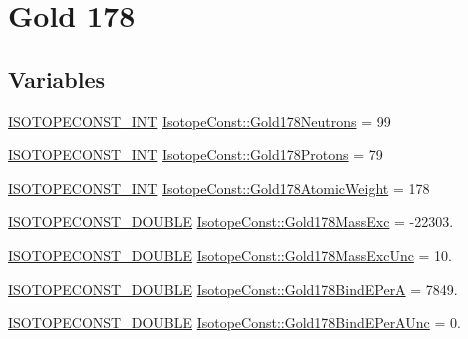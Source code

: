 \hypertarget{group___isotope_const-_gold-_au178}{}\section{Gold 178}
\label{group___isotope_const-_gold-_au178}
\subsection*{Variables}
\begin{DoxyCompactItemize}
\item 
\mbox{\hyperlink{group___isotope_const-_macros_ga5f18360b3e99483a35c32d789e62621c}{I\+S\+O\+T\+O\+P\+E\+C\+O\+N\+S\+T\+\_\+\+I\+NT}} \mbox{\hyperlink{group___isotope_const-_gold-_au178_ga73c46fa2cbd846f3ba7d72ea4b63a835}{Isotope\+Const\+::\+Gold178\+Neutrons}} = 99
\item 
\mbox{\hyperlink{group___isotope_const-_macros_ga5f18360b3e99483a35c32d789e62621c}{I\+S\+O\+T\+O\+P\+E\+C\+O\+N\+S\+T\+\_\+\+I\+NT}} \mbox{\hyperlink{group___isotope_const-_gold-_au178_ga8413b41724d5d9a8403087a3dbaee4da}{Isotope\+Const\+::\+Gold178\+Protons}} = 79
\item 
\mbox{\hyperlink{group___isotope_const-_macros_ga5f18360b3e99483a35c32d789e62621c}{I\+S\+O\+T\+O\+P\+E\+C\+O\+N\+S\+T\+\_\+\+I\+NT}} \mbox{\hyperlink{group___isotope_const-_gold-_au178_ga3683cf8598a77df47cc90702f637760e}{Isotope\+Const\+::\+Gold178\+Atomic\+Weight}} = 178
\item 
\mbox{\hyperlink{group___isotope_const-_macros_ga8f45a7272ce02c0b4c65c44636ed719a}{I\+S\+O\+T\+O\+P\+E\+C\+O\+N\+S\+T\+\_\+\+D\+O\+U\+B\+LE}} \mbox{\hyperlink{group___isotope_const-_gold-_au178_gaf3fa1b63fa6f4c30ade91d41af35bdc4}{Isotope\+Const\+::\+Gold178\+Mass\+Exc}} = -\/22303.
\item 
\mbox{\hyperlink{group___isotope_const-_macros_ga8f45a7272ce02c0b4c65c44636ed719a}{I\+S\+O\+T\+O\+P\+E\+C\+O\+N\+S\+T\+\_\+\+D\+O\+U\+B\+LE}} \mbox{\hyperlink{group___isotope_const-_gold-_au178_ga3c2bd4829c19e3097c985e90f6e1ec86}{Isotope\+Const\+::\+Gold178\+Mass\+Exc\+Unc}} = 10.
\item 
\mbox{\hyperlink{group___isotope_const-_macros_ga8f45a7272ce02c0b4c65c44636ed719a}{I\+S\+O\+T\+O\+P\+E\+C\+O\+N\+S\+T\+\_\+\+D\+O\+U\+B\+LE}} \mbox{\hyperlink{group___isotope_const-_gold-_au178_gaea70c076c1282c2016b1c07f63cc0894}{Isotope\+Const\+::\+Gold178\+Bind\+E\+PerA}} = 7849.
\item 
\mbox{\hyperlink{group___isotope_const-_macros_ga8f45a7272ce02c0b4c65c44636ed719a}{I\+S\+O\+T\+O\+P\+E\+C\+O\+N\+S\+T\+\_\+\+D\+O\+U\+B\+LE}} \mbox{\hyperlink{group___isotope_const-_gold-_au178_ga9dcd374cf7e4f6502c2995a07b0f7a66}{Isotope\+Const\+::\+Gold178\+Bind\+E\+Per\+A\+Unc}} = 0.

\end{DoxyCompactItemize}
